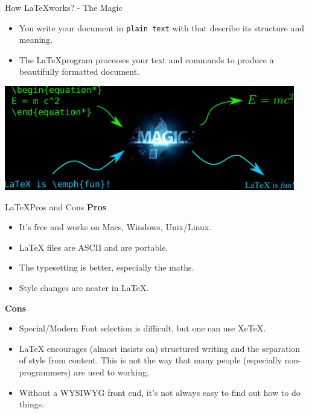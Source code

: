 \documentclass[10pt,times]{beamer}
\begin{document}
\begin{frame}{How \LaTeX works? - The Magic}
\begin{itemize}
\item You write your document in \texttt{plain text} with  that
describe its structure and meaning.
\item The \LaTeX program processes your text and commands to produce a
beautifully formatted document.
\end{itemize}

\centering
\includegraphics[width=0.95\textwidth]{figs/magic.png}
\end{frame}


\begin{frame}{\LaTeX Pros and Cons}
\textbf{Pros}
\begin{itemize}
\item    It's free and works on Macs, Windows, Unix/Linux.
\item    LaTeX files are ASCII and are portable.
\item    The typesetting is better, especially the maths.
\item    Style changes are neater in LaTeX. 
\end{itemize}
\textbf{Cons}
\begin{itemize}
\item    Special/Modern Font selection is difficult, but one can use XeTeX.
\item    LaTeX encourages (almost insists on) structured writing and the 
separation of style from content. This is not the way that many people 
(especially non-programmers) are used to working.
\item    Without a WYSIWYG front end, it's not always easy to find out how to 
do things.
\end{itemize}
\end{frame}
\end{document}
